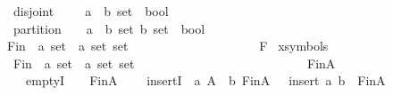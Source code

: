 \begin{isabellebody}
\ \ disjoint\ \ \ \ \ {\isacharcolon}{\isacharcolon}{\isachardoublequoteopen}{\isacharparenleft}{\isacharprime}a\ {\isacharless}{\isacharequal}{\isachargreater}\ {\isacharparenleft}{\isacharprime}b\ set{\isacharparenright}{\isacharparenright}\ {\isacharequal}{\isachargreater}\ bool{\isachardoublequoteclose}\ \ \ \ \ \ \ \ \ \ \ \ \ {\isacharparenleft}{\isachardoublequoteopen}{\isasymdisjoint}{\isachardoublequoteclose}{\isacharparenright}\isanewline
\ \ partition\ \ \ \ {\isacharcolon}{\isacharcolon}{\isachardoublequoteopen}{\isacharbrackleft}{\isacharparenleft}{\isacharprime}a\ {\isacharless}{\isacharequal}{\isachargreater}\ {\isacharparenleft}{\isacharprime}b\ set{\isacharparenright}{\isacharparenright}{\isacharcomma}\ {\isacharparenleft}{\isacharprime}b\ set{\isacharparenright}{\isacharbrackright}\ {\isacharequal}{\isachargreater}\ bool{\isachardoublequoteclose}\ {\isacharparenleft}{\isachardoublequoteopen}{\isacharunderscore}\ {\isasympartition}\ {\isacharunderscore}{\isachardoublequoteclose}\ {\isacharbrackleft}{}{}{\isacharcomma}{}{}{\isacharbrackright}{}{}{\isacharparenright}\isanewline
\isanewline
\isanewline
{}\isamarkupfalse%
\ Fin\ {\isacharcolon}{\isacharcolon}\ {\isachardoublequoteopen}{\isacharprime}a\ set\ {\isacharequal}{\isachargreater}\ {\isacharprime}a\ set\ set{\isachardoublequoteclose}\ \ \ \ \ \ \ \ \ \ \ \ \ \ \ \ \ \ \ \ \ {\isacharparenleft}{\isachardoublequoteopen}{\isacharpercent}F{\isachardoublequoteclose}{\isacharparenright}\isanewline
{}\isamarkupfalse%
\ {\isacharparenleft}xsymbols{\isacharparenright}\isanewline
\ \ Fin\ {\isacharcolon}{\isacharcolon}\ {\isachardoublequoteopen}{\isacharprime}a\ set\ {\isacharequal}{\isachargreater}\ {\isacharprime}a\ set\ set{\isachardoublequoteclose}\ \ \ \ \ \ \ \ \ \ \ \ \ \ \ \ \ \ \ \ \ \ \ \ \ \ {\isacharparenleft}{\isachardoublequoteopen}{\isasymfinset}{\isachardoublequoteclose}{\isacharparenright}\isanewline
\isanewline
{}\isamarkupfalse%
\ {\isachardoublequoteopen}Fin{\isacharparenleft}A{\isacharparenright}{\isachardoublequoteclose}\isanewline
\ \ \isanewline
\ \ \ \ emptyI\ {\isacharcolon}\ {\isachardoublequoteopen}{\isacharbraceleft}{\isacharbraceright}\ {\isacharcolon}\ Fin{\isacharparenleft}A{\isacharparenright}{\isachardoublequoteclose}\isanewline
\ \ \ \ insertI{\isacharcolon}\ {\isachardoublequoteopen}{\isacharbrackleft}{\isacharbar}\ a{\isacharcolon}\ A{\isacharsemicolon}\ \ b{\isacharcolon}\ Fin{\isacharparenleft}A{\isacharparenright}\ {\isacharbar}{\isacharbrackright}\ {\isacharequal}{\isacharequal}{\isachargreater}\ insert\ a\ b\ {\isacharcolon}\ Fin{\isacharparenleft}A{\isacharparenright}{\isachardoublequoteclose}\isanewline

\end{isabellebody}

